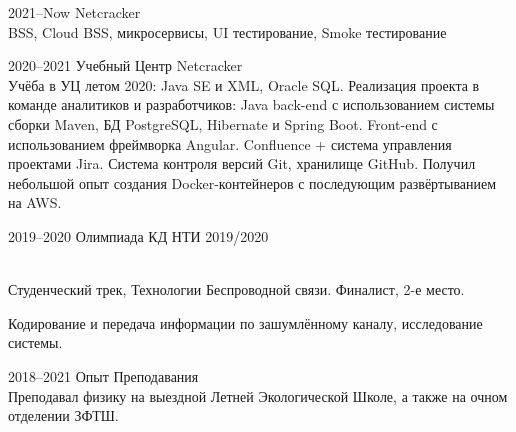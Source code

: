 \documentclass[]{cv-style}          %
\begin{document}
\begin{entrylist}

\entry
    {2021--Now}
    {Netcracker}
    {}
    {\\ 
BSS, Cloud BSS, микросервисы, UI тестирование, Smoke тестирование}

\entry
    {2020--2021}
    {Учебный Центр Netcracker}
    {}
    {\jobtitle{}\\ 
Учёба в УЦ летом 2020: Java SE и XML, Oracle SQL. Реализация проекта в команде аналитиков и разработчиков: Java back-end с использованием системы сборки Maven, БД PostgreSQL, Hibernate и Spring Boot. Front-end с использованием фреймворка Angular. Confluence + система управления проектами Jira. Система контроля версий Git, хранилище GitHub. Получил небольшой опыт создания Docker-контейнеров с последующим развёртыванием на AWS.}

\entry
    {2019--2020}
    {Олимпиада КД НТИ 2019/2020}
    {}
    {\jobtitle{}\\
Студенческий трек, Технологии Беспроводной связи. Финалист, 2-е место.

Кодирование и передача информации по зашумлённому каналу, исследование системы.}


\entry
    {2018--2021}
    {Опыт Преподавания}
    {}
    {\jobtitle{}\\
Преподавал физику на выездной Летней Экологической Школе, а также на очном отделении ЗФТШ.}

%
%
%
%

\end{entrylist}
\end{document}
